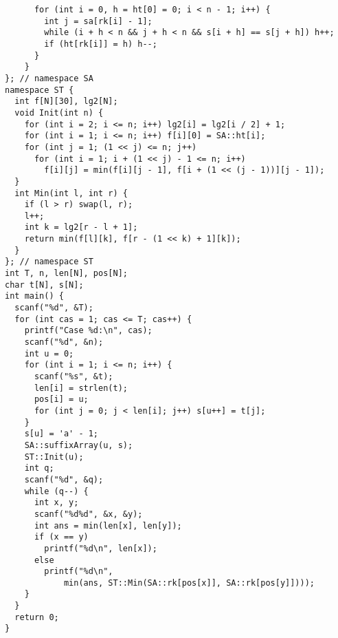 \begin{lstlisting}
      for (int i = 0, h = ht[0] = 0; i < n - 1; i++) {
        int j = sa[rk[i] - 1];
        while (i + h < n && j + h < n && s[i + h] == s[j + h]) h++;
        if (ht[rk[i]] = h) h--;
      }
    }
}; // namespace SA
namespace ST {
  int f[N][30], lg2[N];
  void Init(int n) {
    for (int i = 2; i <= n; i++) lg2[i] = lg2[i / 2] + 1;
    for (int i = 1; i <= n; i++) f[i][0] = SA::ht[i];
    for (int j = 1; (1 << j) <= n; j++)
      for (int i = 1; i + (1 << j) - 1 <= n; i++)
        f[i][j] = min(f[i][j - 1], f[i + (1 << (j - 1))][j - 1]);
  }
  int Min(int l, int r) {
    if (l > r) swap(l, r);
    l++;
    int k = lg2[r - l + 1];
    return min(f[l][k], f[r - (1 << k) + 1][k]);
  }
}; // namespace ST
int T, n, len[N], pos[N];
char t[N], s[N];
int main() {
  scanf("%d", &T);
  for (int cas = 1; cas <= T; cas++) {
    printf("Case %d:\n", cas);
    scanf("%d", &n);
    int u = 0;
    for (int i = 1; i <= n; i++) {
      scanf("%s", &t);
      len[i] = strlen(t);
      pos[i] = u;
      for (int j = 0; j < len[i]; j++) s[u++] = t[j];
    }
    s[u] = 'a' - 1;
    SA::suffixArray(u, s);
    ST::Init(u);
    int q;
    scanf("%d", &q);
    while (q--) {
      int x, y;
      scanf("%d%d", &x, &y);
      int ans = min(len[x], len[y]);
      if (x == y)
        printf("%d\n", len[x]);
      else
        printf("%d\n",
            min(ans, ST::Min(SA::rk[pos[x]], SA::rk[pos[y]])));
    }
  }
  return 0;
}
\end{lstlisting}

